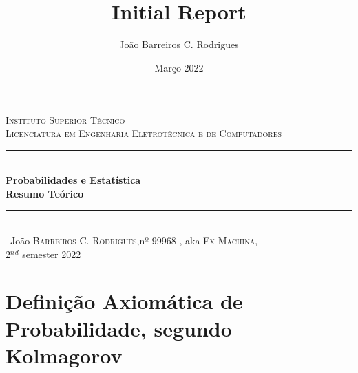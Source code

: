\documentclass[a4paper,12pt]{article}
\date{Março 2022}
\title{ \\ \large {Initial Report}}
\author{João Barreiros C. Rodrigues}
\begin{document}
        \begin{titlepage} %
        \newcommand{\HRule}{\rule{\linewidth}{0.5mm}} %
        \center %
        \textsc{\LARGE Instituto Superior Técnico}\\[1.5cm] %
        \textsc{\Large Licenciatura em Engenharia Eletrotécnica e de Computadores}\\[0.25cm]
        \HRule\\[0.4cm]
        {\LARGE\bfseries Probabilidades e Estatística}\\[0.4cm] %
        {\huge\bfseries Resumo Teórico}\\[0.4cm] %
        \HRule\\[1.5cm]\
        João \textsc{Barreiros C. Rodrigues},nº 99968 , aka \textsc{Ex-Machina},\\
        \vfill\vfill\vfill %
        {\large 2$^n$$^d$ semester 2022} %
        \vfill %
\end{titlepage}
        \newpage
        \tableofcontents
        \clearpage
        \section{Definição Axiomática de Probabilidade, segundo Kolmagorov}
                \par
\end{document}
